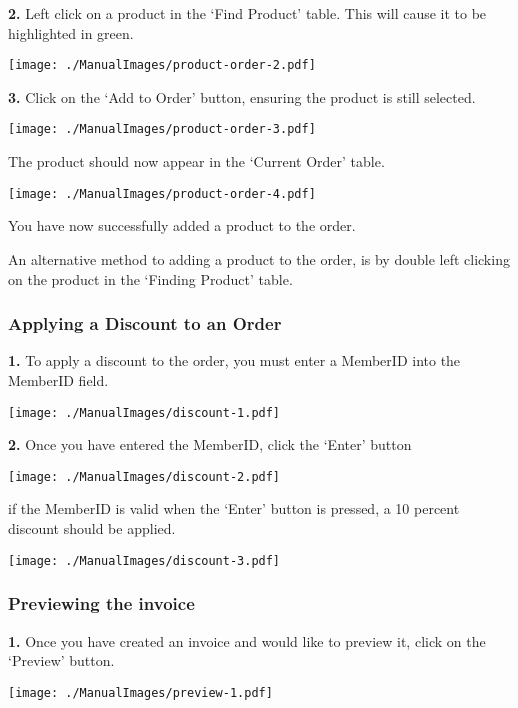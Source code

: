 \textbf{2.} Left click on a product in the `Find Product' table. This will cause it to be highlighted in green.

\texttt{[image: ./ManualImages/product-order-2.pdf]}

\textbf{3.} Click on the `Add to Order' button, ensuring the product is still selected.

\texttt{[image: ./ManualImages/product-order-3.pdf]}

The product should now appear in the `Current Order' table.

\texttt{[image: ./ManualImages/product-order-4.pdf]}

You have now successfully added a product to the order.

An alternative method to adding a product to the order, is by double left clicking on the product in the `Finding Product' table.

\pagebreak
\subsubsection{Applying a Discount to an Order}
\label{fig:Applying a Discount to an Order}

\textbf{1.} To apply a discount to the order, you must enter a MemberID into the MemberID field.

\texttt{[image: ./ManualImages/discount-1.pdf]}

\textbf{2.} Once you have entered the MemberID, click the `Enter' button

\texttt{[image: ./ManualImages/discount-2.pdf]}

\pagebreak

if the MemberID is valid when the `Enter' button is pressed, a 10 percent discount should be applied.

\texttt{[image: ./ManualImages/discount-3.pdf]}

\pagebreak
\subsubsection{Previewing the invoice}
\label{fig:Previewing the invoice}

\textbf{1.} Once you have created an invoice and would like to preview it, click on the `Preview' button.

\texttt{[image: ./ManualImages/preview-1.pdf]}

\pagebreak
